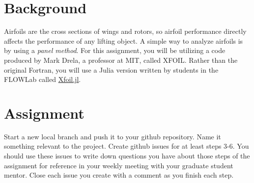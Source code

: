 \documentclass[12pt]{article}
\begin{document}
	


\section{Background}

Airfoils are the cross sections of wings and rotors, so airfoil performance directly affects the performance of any lifting object.
A simple way to analyze airfoils is by using a \textit{panel method}. 
For this assignment, you will be utilizing a code produced by Mark Drela, a professor at MIT, called XFOIL.  Rather than the original Fortran, you will use a Julia version written by students in the FLOWLab called \href{https://github.com/byuflowlab/Xfoil.jl}{Xfoil.jl}.


\section{Assignment}

Start a new local branch and push it to your github repository. Name it something relevant to the project. Create github issues for at least steps 3-6. You should use these issues to write down questions you have about those steps of the assignment for reference in your weekly meeting with your graduate student mentor. Close each issue you create with a comment as you finish each step. 
\end{document}
